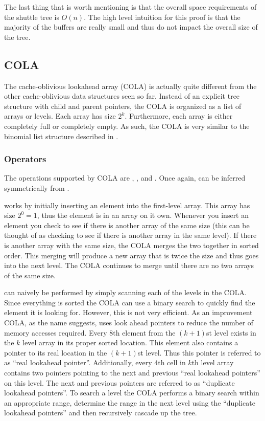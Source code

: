 \documentclass{style}
\begin{document}
The last thing that is worth mentioning is that the overall space requirements
of the shuttle tree is $O(n)$. The high level intuition for this proof is that
the majority of the buffers are really small and thus do not impact the
overall size of the tree.

\subsection{COLA}

The cache-oblivious lookahead array (COLA) is actually quite different from
the other cache-oblivious data structures seen so far. Instead of an explicit
tree structure with child and parent pointers, the COLA is organized as a list
of arrays or levels. Each array has size $2^k$. Furthermore, each array is
either completely full or completely empty. As such, the COLA is very similar
to the binomial list structure described in \cite{BentleySaxe}.

\subsubsection{Operators}

The operations supported by COLA are \Search{}, \Insert{}, and \Scan{}. Once
again, \Delete{} can be inferred symmetrically from \Insert{}.

\Insert{} works by initially inserting an element into the first-level array.
This array has size $2^0 = 1$, thus the element is in an array on it own.
Whenever you insert an element you check to see if there is another array of
the same size (this can be thought of as checking to see if there is another
array in the same level). If there is another array with the same size, the
COLA merges the two together in sorted order. This merging will produce a new
array that is twice the size and thus goes into the next level. The COLA
continues to merge until there are no two arrays of the same size.

\Search{} can naively be performed by simply scanning each of the levels in
the COLA. Since everything is sorted the COLA can use a binary search to
quickly find the element it is looking for. However, this is not very
efficient. As an improvement COLA, as the name suggests, uses look ahead
pointers to reduce the number of memory accesses required. Every 8th element
from the $(k+1)$st level exists in the $k$ level array in its proper sorted
location. This element also contains a pointer to its real location in the
$(k+1)$st level. Thus this pointer is referred to as ``real lookahead
pointer''. Additionally, every 4th cell in $k$th level array contains two
pointers pointing to the next and previous ``real lookahead pointers'' on this
level. The next and previous pointers are referred to as ``duplicate lookahead
pointers''. To search a level the COLA performs a binary search within an
appropriate range, determine the range in the next level using the ``duplicate
lookahead pointers'' and then recursively cascade up the tree.
\end{document}
